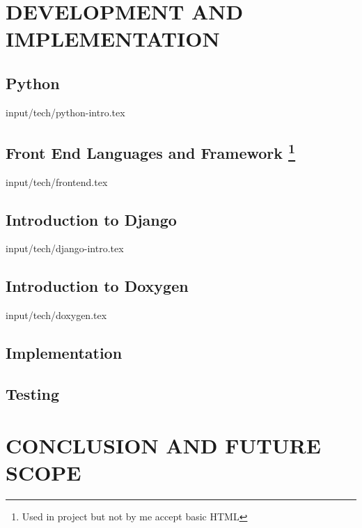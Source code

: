 \documentclass[12pt]{report}
\begin{document}
\newpage
\chapter{DEVELOPMENT AND IMPLEMENTATION}
\section{Python} 
 {input/tech/python-intro.tex}


\section[Front End Languages and Framework]{Front End Languages 
and Framework \footnote{ Used in project but not by me accept 
basic HTML}}
 {input/tech/frontend.tex}




\section{Introduction to Django}
 {input/tech/django-intro.tex}

\section{Introduction to Doxygen}
 {input/tech/doxygen.tex}






\section{Implementation}


\section{Testing}


\chapter{CONCLUSION AND FUTURE SCOPE}



\end{document}
